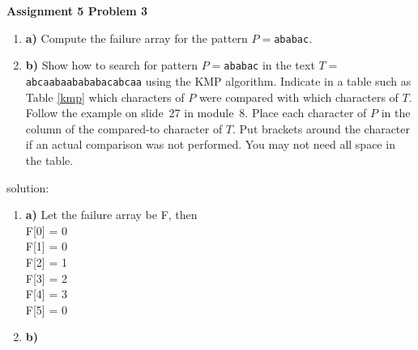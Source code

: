 \documentclass[12pt]{article}
\begin{document}
	
	\begin{center}
		{\Large\bf Assignment 5 Problem 3}\\
		\vspace{3mm}
	\end{center}
	
	\def\question#1{\item[\bf #1.]}
	\def\part#1{\item[\bf #1)]}
	\newcommand{\pc}[1]{\mbox{\textbf{#1}}} %
	
	\begin{enumerate}
		\part{a} Compute the failure array for the pattern $P=$\texttt{ababac}.
		
		\part{b}
		Show how to search for pattern $P=$\texttt{ababac} in the text $T=$\texttt{abcaabaabababacabcaa} using the KMP algorithm.
		Indicate in a table such as Table \ref{kmp} which characters of $P$ were compared with which characters of $T$. 
		Follow the example on slide~27 in module~8.
		Place each character of $P$ in the column of the compared-to character of $T$.  
		Put brackets around the character if an actual comparison was not performed. 
		You may not need all space in the table.
		
	\end{enumerate}

	solution:
	\begin{enumerate}
		\part{a} Let the failure array be F, then\\
		F[0] = 0\\
		F[1] = 0\\
		F[2] = 1\\
		F[3] = 2\\
		F[4] = 3\\
		F[5] = 0
		
		\part{b}
	\end{enumerate}
	
	
\end{document}
